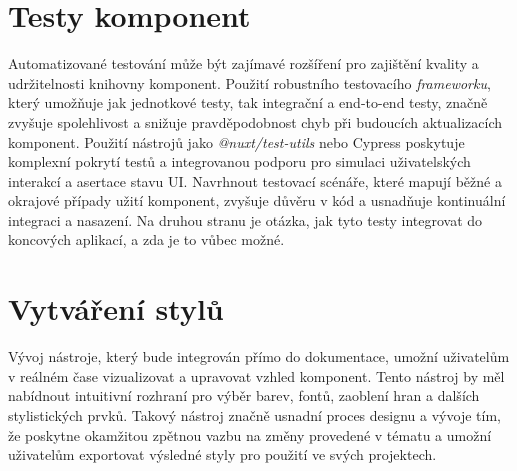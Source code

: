 \section{Testy komponent}
Automatizované testování může být zajímavé rozšíření pro zajištění kvality a udržitelnosti knihovny komponent. Použití robustního testovacího \emph{frameworku}, který umožňuje jak jednotkové testy, tak integrační a end-to-end testy, značně zvyšuje spolehlivost a snižuje pravděpodobnost chyb při budoucích aktualizacích komponent. Použití nástrojů jako \emph{@nuxt/test-utils} nebo Cypress poskytuje komplexní pokrytí testů a integrovanou podporu pro simulaci uživatelských interakcí a asertace stavu UI. Navrhnout testovací scénáře, které mapují běžné a okrajové případy užití komponent, zvyšuje důvěru v kód a usnadňuje kontinuální integraci a nasazení. Na druhou stranu je otázka, jak tyto testy integrovat do koncových aplikací, a zda je to vůbec možné.

\section{Vytváření stylů}
Vývoj  nástroje, který bude integrován přímo do dokumentace, umožní uživatelům v reálném čase vizualizovat a upravovat vzhled komponent. Tento nástroj by měl nabídnout intuitivní rozhraní pro výběr barev, fontů, zaoblení hran a dalších stylistických prvků. Takový nástroj značně usnadní proces designu a vývoje tím, že poskytne okamžitou zpětnou vazbu na změny provedené v tématu a umožní uživatelům exportovat výsledné styly pro použití ve svých projektech.
